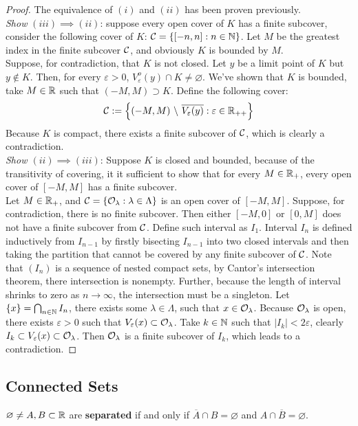\documentclass[11pt]{article}
\begin{document}
	\begin{proof}
		The equivalence of $(i)$ and $(ii)$ has been proven previously. \\
		\emph{Show} $(iii) \implies (ii)$: suppose every open cover of $K$ has a finite subcover, consider the following cover of $K$: $\mathcal{{C}} = \{[-n, n]: n \in \mathbb{N}\}$. Let $M$ be the greatest index in the finite subcover $\mathcal{{C}}$, and obviously $K$ is bounded by $M$. \\
		Suppose, for contradiction, that $K$ is not closed. Let $y$ be a limit point of $K$ but $y \notin K$. Then, for every $\varepsilon > 0$, $V_\varepsilon^o(y) \cap K \neq \varnothing$. We've shown that $K$ is bounded, take $M \in \mathbb{R}$ such that $(-M, M) \supset K$. Define the following cover:
		\begin{align}
			\mathcal{{C}} := \left\{
			(-M, M)\ \backslash\ \overline{V_\varepsilon(y)}
			:\varepsilon \in \mathbb{R}_{++}
			\right\}
		\end{align}
		Because $K$ is compact, there exists a finite subcover of $\mathcal{{C}}$, which is clearly a contradiction. \\
		\emph{Show $(ii) \implies (iii)$}: Suppose $K$ is closed and bounded, because of the transitivity of covering, it it sufficient to show that for every $M \in \mathbb{R}_+$, every open cover of $[-M, M]$ has a finite subcover. \\
		Let $M \in \mathbb{R}_+$, and $\mathcal{{C}} = \{\mathcal{{O}}_\lambda: \lambda \in \Lambda\}$ is an open cover of $[-M, M]$. Suppose, for contradiction, there is no finite subcover. Then either $[-M, 0]$ or $[0, M]$ does not have a finite subcover from $\mathcal{{C}}$. Define such interval as $I_1$. Interval $I_n$ is defined inductively from $I_{n-1}$ by firstly bisecting $I_{n-1}$ into two closed intervals and then taking the partition that cannot be covered by any finite subcover of $\mathcal{{C}}$. Note that $(I_n)$ is a sequence of nested compact sets, by Cantor's intersection theorem, there intersection is nonempty. Further, because the length of interval shrinks to zero as $n \to \infty$, the intersection must be a singleton. Let $\{x\} = \bigcap_{n \in \mathbb{N}} I_n$, there exists some $\lambda \in \Lambda$, such that $x \in \mathcal{{O}}_\lambda$. Because $\mathcal{{O}}_\lambda$ is open, there exists $\varepsilon > 0$ such that $V_\varepsilon(x) \subset \mathcal{{O}}_\lambda$. Take $k \in \mathbb{N}$ such that $|I_k| < 2\varepsilon$, clearly $I_k \subset V_\varepsilon(x) \subset \mathcal{{O}}_\lambda$. Then $\mathcal{{O}}_\lambda$ is a finite subcover of $I_k$, which leads to a contradiction.
	\end{proof}
	\subsection{Connected Sets}
	\begin{definition}
		$\varnothing \neq A, B \subset \mathbb{R}$ are \textbf{separated} if and only if $\overline{A} \cap B = \varnothing$ and $A \cap \overline{B} = \varnothing$.
	\end{definition}
	
\end{document}
